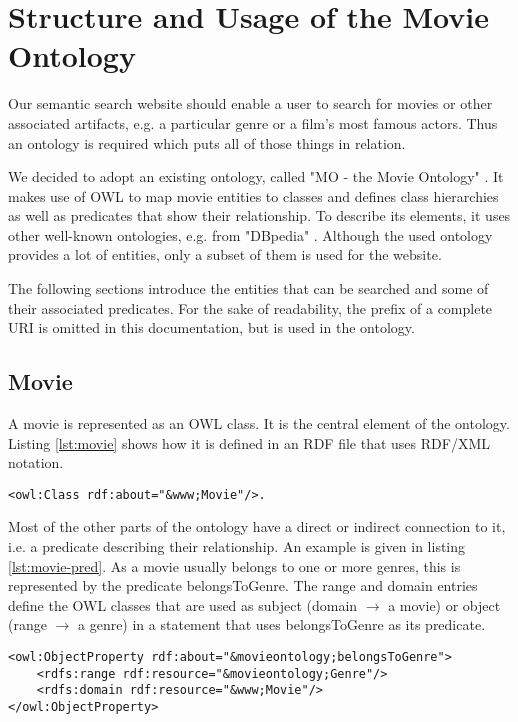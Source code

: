 \section{Structure and Usage of the Movie Ontology}
\label{sec:ontology}
Our semantic search website should enable a user to search for movies or other associated artifacts, e.g. a particular genre or a film's most famous actors. Thus an ontology is required which puts all of those things in relation.

We decided to adopt an existing ontology, called "MO - the Movie Ontology" \cite{bouza:movieontology}. It makes use of OWL to map movie entities to classes and defines class hierarchies as well as predicates that show their relationship. To describe its elements, it uses other well-known ontologies, e.g. from "DBpedia" \cite{dbpedia-swj}. Although the used ontology provides a lot of entities, only a subset of them is used for the website. 

The following sections introduce the entities that can be searched and some of their associated predicates. For the sake of readability, the prefix of a complete URI is omitted in this documentation, but is used in the ontology.

\subsection{Movie}
A movie is represented as an OWL class. It is the central element of the ontology. Listing \ref{lst:movie} shows how it is defined in an RDF file that uses RDF/XML notation.

\begin{lstlisting}[caption={OWL Movie Class in RDF/XML notation},label={lst:movie}]
<owl:Class rdf:about="&www;Movie"/>.
\end{lstlisting}

Most of the other parts of the ontology have a direct or indirect connection to it, i.e. a predicate describing their relationship. An example is given in listing \ref{lst:movie-pred}. As a movie usually belongs to one or more genres, this is represented by the predicate belongsToGenre. The range and domain entries define the OWL classes that are used as subject (domain $\rightarrow$ a movie) or object (range $\rightarrow$ a genre) in a statement that uses belongsToGenre as its predicate.

\begin{lstlisting}[caption={Exemplary Movie predicate in RDF/XML notation},label={lst:movie-pred}]
<owl:ObjectProperty rdf:about="&movieontology;belongsToGenre">
    <rdfs:range rdf:resource="&movieontology;Genre"/>
    <rdfs:domain rdf:resource="&www;Movie"/>
</owl:ObjectProperty>
\end{lstlisting}

